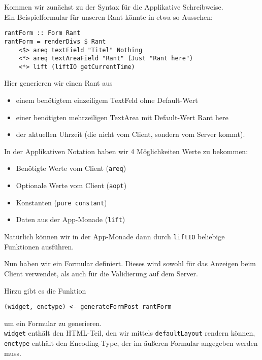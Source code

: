 \documentclass{beamer}
\begin{document}
\begin{frame}[fragile]
Kommen wir zunächst zu der Syntax für die Applikative Schreibweise.\\\pause
Ein Beispielformular für unseren Rant könnte in etwa so Aussehen:
\begin{verbatim}
rantForm :: Form Rant
rantForm = renderDivs $ Rant
    <$> areq textField "Titel" Nothing
    <*> areq textAreaField "Rant" (Just "Rant here")
    <*> lift (liftIO getCurrentTime)
\end{verbatim}
\pause
Hier generieren wir einen Rant aus
\begin{itemize}
 \item einem benötigtem einzeiligem TextFeld ohne Default-Wert
 \item einer benötigten mehrzeiligen TextArea mit Default-Wert \glqq Rant here\grqq
 \item der aktuellen Uhrzeit (die nicht vom Client, sondern vom Server kommt).
\end{itemize}
\end{frame}

\begin{frame}[fragile]
In der Applikativen Notation haben wir 4 Möglichkeiten Werte zu bekommen:\pause
\begin{itemize}
 \item Benötigte Werte vom Client (\texttt{areq})
 \pause
 \item Optionale Werte vom Client (\texttt{aopt})
 \pause
 \item Konstanten (\texttt{pure constant})
 \pause
 \item Daten aus der App-Monade (\texttt{lift})
 \pause
\end{itemize}
Natürlich können wir in der App-Monade dann durch \texttt{liftIO} beliebige Funktionen ausführen.
\end{frame}

\begin{frame}[fragile]
Nun haben wir ein Formular definiert. Dieses wird sowohl für das Anzeigen beim Client verwendet, als auch für die Validierung auf dem Server.\\\par\pause

Hirzu gibt es die Funktion
\begin{verbatim}
(widget, enctype) <- generateFormPost rantForm
\end{verbatim}
um ein Formular zu generieren.\pause \\
\texttt{widget} enthält den HTML-Teil, den wir mittels \texttt{defaultLayout} rendern können, \texttt{enctype} enthält den Encoding-Type, der im äußeren Formular angegeben werden muss.\\
\end{frame}
\end{document}
